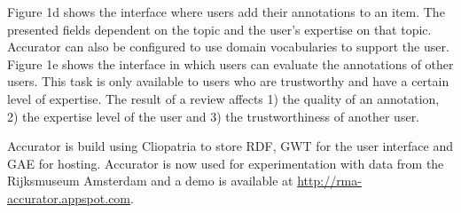 Figure 1d shows the interface where users add their annotations to an item. The presented fields dependent on the topic and the user's expertise on that topic. 
Accurator can also be configured to use domain vocabularies to support the user. Figure 1e shows the interface in which users can evaluate the annotations of other users. This task is only available to users who are trustworthy and have a certain level of expertise. The result of a review affects 1) the quality of an annotation, 2) the expertise level of the user and 3) the trustworthiness of another user.


Accurator is build using Cliopatria to store RDF, GWT for the user interface and GAE for hosting. Accurator is now used for experimentation with data from the Rijksmuseum Amsterdam and a demo is available at \url{http://rma-accurator.appspot.com}.



